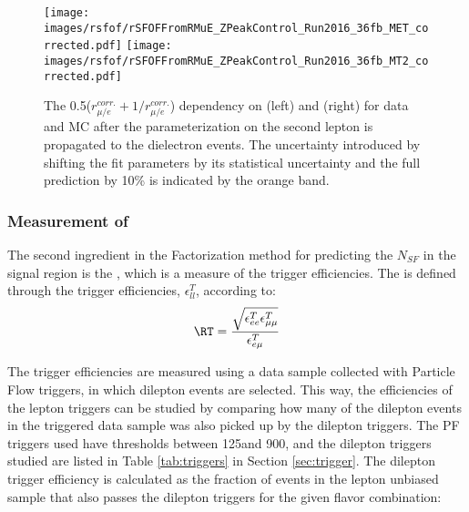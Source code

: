 \begin{figure}[htbp!]
\begin{center}
    \texttt{[image: images/rsfof/rSFOFFromRMuE\_ZPeakControl\_Run2016\_36fb\_MET\_corrected.pdf]}
    \texttt{[image: images/rsfof/rSFOFFromRMuE\_ZPeakControl\_Run2016\_36fb\_MT2\_corrected.pdf]}
    \caption{The 0.5($r_{\mu/e}^{corr.}+1/r_{\mu/e}^{corr.}$) dependency on \ptmiss (left) and \mttwo (right) for data and MC after the parameterization on the second lepton \pt is propagated to the dielectron events. The uncertainty introduced by shifting the fit parameters by its statistical uncertainty and the full prediction by 10\% is indicated by the orange band.}
\label{fig:RDependency}
\end{center}
\end{figure}                                                                                                                                                                                                                                                                                                                                                                                     
\subsubsection{Measurement of \RT}
The second ingredient in the Factorization method for predicting the $N_{SF}$ in the signal region is the \RT, which is a measure of the trigger efficiencies. 
The \RT is defined through the trigger efficiencies, $\epsilon_{ll}^{T}$,  according to:
\begin{equation}
\label{eq:masterformulaExp}
    \RT = \frac{\sqrt{\epsilon^{T}_{ee}\epsilon^{T}_{\mu\mu}}}{\epsilon^{T}_{e\mu}}
\end{equation}                                               

The trigger efficiencies are measured using a data sample collected with Particle Flow \HT triggers, in which dilepton events are selected. 
This way, the efficiencies of the lepton triggers can be studied by comparing how many of the dilepton events in the \HT triggered data sample was also picked up by the dilepton triggers. 
The PF \HT triggers used have thresholds between 125\GeV and 900\GeV, and the dilepton triggers studied are listed in Table \ref{tab:triggers} in Section \ref{sec:trigger}. 
The dilepton trigger efficiency is calculated as the fraction of events in the lepton unbiased sample that also passes the dilepton triggers for the given flavor combination: 


